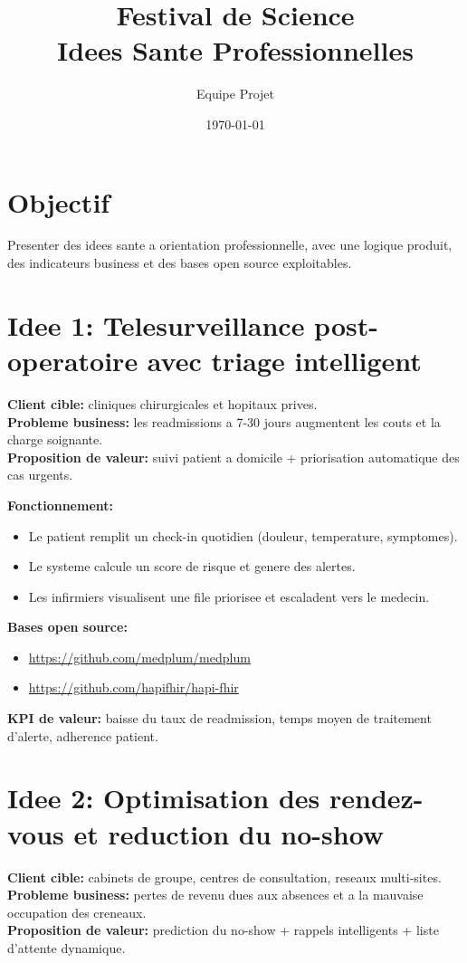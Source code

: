 \documentclass[11pt,a4paper]{article}
\title{Festival de Science\\Idees Sante Professionnelles}
\author{Equipe Projet}
\date{\today}
\begin{document}
\maketitle

\section*{Objectif}
Presenter des idees sante a orientation professionnelle, avec une logique produit,
des indicateurs business et des bases open source exploitables.

\section*{Idee 1: Telesurveillance post-operatoire avec triage intelligent}
\textbf{Client cible:} cliniques chirurgicales et hopitaux prives.\\
\textbf{Probleme business:} les readmissions a 7-30 jours augmentent les couts et la charge soignante.\\
\textbf{Proposition de valeur:} suivi patient a domicile + priorisation automatique des cas urgents.

\textbf{Fonctionnement:}
\begin{itemize}[leftmargin=*]
  \item Le patient remplit un check-in quotidien (douleur, temperature, symptomes).
  \item Le systeme calcule un score de risque et genere des alertes.
  \item Les infirmiers visualisent une file priorisee et escaladent vers le medecin.
\end{itemize}

\textbf{Bases open source:}
\begin{itemize}[leftmargin=*]
  \item \url{https://github.com/medplum/medplum}
  \item \url{https://github.com/hapifhir/hapi-fhir}
\end{itemize}

\textbf{KPI de valeur:} baisse du taux de readmission, temps moyen de traitement d'alerte, adherence patient.

\section*{Idee 2: Optimisation des rendez-vous et reduction du no-show}
\textbf{Client cible:} cabinets de groupe, centres de consultation, reseaux multi-sites.\\
\textbf{Probleme business:} pertes de revenu dues aux absences et a la mauvaise occupation des creneaux.\\
\textbf{Proposition de valeur:} prediction du no-show + rappels intelligents + liste d'attente dynamique.
\end{document}
